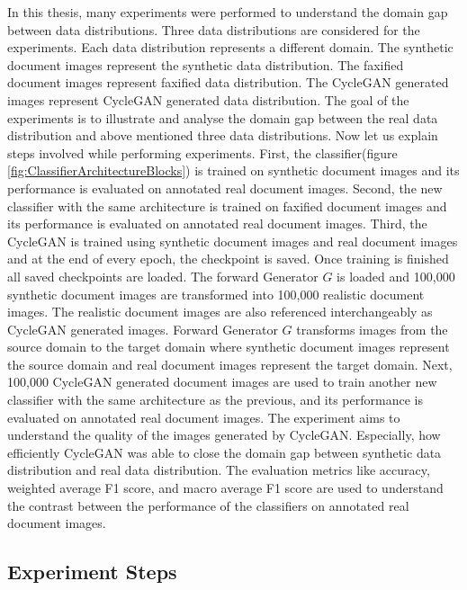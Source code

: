 In this thesis, many experiments were performed to understand the domain gap between data distributions. Three data distributions are considered for the experiments. Each data distribution represents a different domain. The synthetic document images represent the synthetic data distribution. The faxified document images represent faxified data distribution. The \ac{CycleGAN} generated images represent \ac{CycleGAN} generated data distribution. The goal of the experiments is to illustrate and analyse the domain gap between the real data distribution and above mentioned three data distributions. Now let us explain steps involved while performing experiments. First, the classifier(figure \ref{fig:ClassifierArchitectureBlocks}) is trained on synthetic document images and its performance is evaluated on annotated real document images. Second, the new classifier with the same architecture is trained on faxified document images and its performance is evaluated on annotated real document images. Third, the \ac{CycleGAN} is trained using synthetic document images and real document images and at the end of every epoch, the checkpoint is saved. Once training is finished all saved checkpoints are loaded. The forward Generator $G$ is loaded and 100,000 synthetic document images are transformed into 100,000 realistic document images. The realistic document images are also referenced interchangeably as \ac{CycleGAN} generated images. Forward Generator $G$  transforms images from the source domain to the target domain where synthetic document images represent the source domain and real document images represent the target domain. Next, 100,000 \ac{CycleGAN} generated document images are used to train another new classifier with the same architecture as the previous, and its performance is evaluated on annotated real document images. The experiment aims to understand the quality of the images generated by \ac{CycleGAN}. Especially, how efficiently \ac{CycleGAN} was able to close the domain gap between synthetic data distribution and real data distribution. The evaluation metrics like accuracy, weighted average F1 score, and macro average F1 score \cite{lipton2014thresholding} are used to understand the contrast between the performance of the classifiers on annotated real document images.

\subsection{Experiment Steps}


